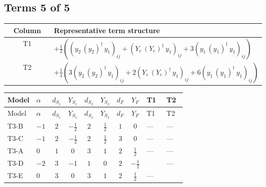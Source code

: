 \documentclass[8pt]{article}
\begin{document}
\begin{landscape}
\subsection*{Terms 5 of 5}
\begin{center}
\begin{tabular}{@{}c >{\raggedright\arraybackslash}p{0.82\linewidth}@{}}
\toprule
Column & Representative term structure \\
\midrule
T1 & \(\displaystyle +\frac{1}{2} (\left({y_2}\,\left({y_2}\right)^{\dagger}\,{y_1}\right)_{ij}+\left({Y_e}\,\left({Y_e}\right)^{\dagger}\,{y_1}\right)_{ij}+3 \left({y_1}\,\left({y_1}\right)^{\dagger}\,{y_1}\right)_{ij})\) \\
\midrule
T2 & \(\displaystyle +\frac{1}{4} (3 \left({y_2}\,\left({y_2}\right)^{\dagger}\,{y_1}\right)_{ij}+2 \left({Y_e}\,\left({Y_e}\right)^{\dagger}\,{y_1}\right)_{ij}+6 \left({y_1}\,\left({y_1}\right)^{\dagger}\,{y_1}\right)_{ij})\) \\
\midrule
\bottomrule
\end{tabular}
\end{center}
\smallskip
\tiny
\begin{longtable}{@{}llcccccc >{\raggedright\arraybackslash}p{0.21\linewidth} >{\raggedright\arraybackslash}p{0.21\linewidth}@{}}
\toprule
Model & $\alpha$ & $d_{S_1}$ & $Y_{S_1}$ & $d_{S_2}$ & $Y_{S_2}$ & $d_F$ & $Y_F$ & T1 & T2 \\
\midrule
\endfirsthead
\toprule
Model & $\alpha$ & $d_{S_1}$ & $Y_{S_1}$ & $d_{S_2}$ & $Y_{S_2}$ & $d_F$ & $Y_F$ & T1 & T2 \\
\midrule
\endhead
T3-B & $-1$ & $2$ & $-\frac{1}{2}$ & $2$ & $\frac{1}{2}$ & $1$ & $0$ & --- & --- \\
\midrule
T3-C & $-1$ & $2$ & $-\frac{1}{2}$ & $2$ & $\frac{1}{2}$ & $3$ & $0$ & --- & --- \\
\midrule
T3-A & $0$ & $1$ & $0$ & $3$ & $1$ & $2$ & $\frac{1}{2}$ & --- & --- \\
\midrule
T3-D & $-2$ & $3$ & $-1$ & $1$ & $0$ & $2$ & $-\frac{1}{2}$ & \scriptsize\adjustbox{max width=\linewidth}{$\begin{gathered} +\frac{1}{2} (\left({y_2}\,\left({y_2}\right)^{\dagger}\,{y_1}\right)_{ij}+\left({Y_e}\,\left({Y_e}\right)^{\dagger}\,{y_1}\right)_{ij}+3 \left({y_1}\,\left({y_1}\right)^{\dagger}\,{y_1}\right)_{ij})\end{gathered}$} & --- \\
\midrule
T3-E & $0$ & $3$ & $0$ & $3$ & $1$ & $2$ & $\frac{1}{2}$ & --- & \scriptsize\adjustbox{max width=\linewidth}{$\begin{gathered} +\frac{1}{4} (3 \left({y_2}\,\left({y_2}\right)^{\dagger}\,{y_1}\right)_{ij}+2 \left({Y_e}\,\left({Y_e}\right)^{\dagger}\,{y_1}\right)_{ij}+6 \left({y_1}\,\left({y_1}\right)^{\dagger}\,{y_1}\right)_{ij})\end{gathered}$} \\
\midrule
\bottomrule
\end{longtable}
\clearpage

\end{landscape}
\end{document}
